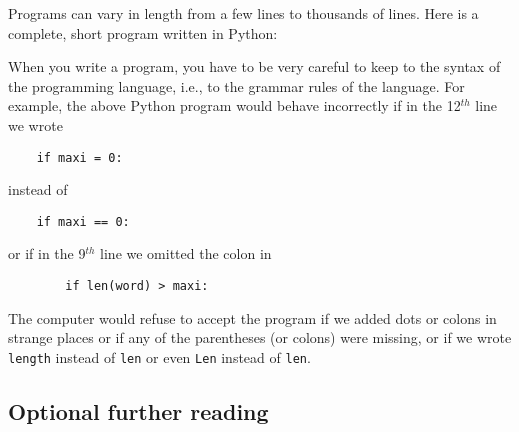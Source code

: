 Programs can vary in length from a few lines to thousands of lines.
Here is a complete, short program written in Python:


\pagebreak

When you write a program, you have to be very careful to keep to the
syntax of the programming language, i.e., to the grammar rules of the language.
For example, the above Python program would
behave incorrectly if in the 12$^{th}$ line we wrote

\begin{Verbatim}
    if maxi = 0:
\end{Verbatim}

instead of 

\begin{Verbatim}
    if maxi == 0:
\end{Verbatim}

or if in the 9$^{th}$ line we omitted the colon in

\begin{Verbatim}
        if len(word) > maxi:
\end{Verbatim}

The computer would refuse to accept the program if we added dots or colons
in strange places
or if any of the parentheses (or colons) were missing, or if we wrote
\verb!length! instead of \verb!len! or even \verb!Len! instead of \verb!len!.

% 

\subsection{Optional further reading}



